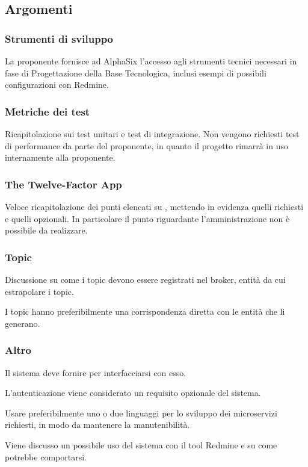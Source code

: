         \subsection{Argomenti}
            \subsubsection{Strumenti di sviluppo}
            La proponente fornisce ad AlphaSix l'accesso agli strumenti tecnici necessari in fase di Progettazione della Base Tecnologica, inclusi esempi di possibili configurazioni con Redmine.

            \subsubsection{Metriche dei test}
            Ricapitolazione sui test unitari e test di integrazione. Non vengono richiesti test di performance da parte del proponente, in quanto il progetto rimarrà in uso internamente alla proponente.
            
            \subsubsection{The Twelve-Factor App}
            Veloce ricapitolazione dei punti elencati su , mettendo in evidenza quelli richiesti e quelli opzionali. In particolare il punto riguardante l'amministrazione non è possibile da realizzare.
            
            \subsubsection{Topic}
            Discussione su come i topic devono essere registrati nel broker, entità da cui estrapolare i topic.\par
            I topic hanno preferibilmente una corrispondenza diretta con le entità che li generano.            
            
            \subsubsection{Altro}
            Il sistema deve fornire  per interfacciarsi con esso.\par
            L'autenticazione viene considerato un requisito opzionale del sistema.\par
            Usare preferibilmente uno o due linguaggi per lo sviluppo dei microservizi richiesti, in modo da mantenere la manutenibilità.\par
            Viene discusso un possibile uso del sistema con il tool Redmine e su come potrebbe comportarsi.
            

